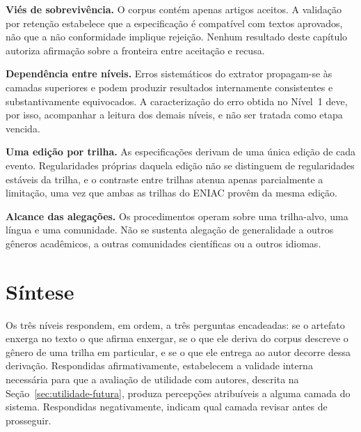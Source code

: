 \textbf{Viés de sobrevivência.} O corpus contém apenas artigos aceitos. A validação por retenção estabelece que a especificação é compatível com textos aprovados, não que a não conformidade implique rejeição. Nenhum resultado deste capítulo autoriza afirmação sobre a fronteira entre aceitação e recusa.

\textbf{Dependência entre níveis.} Erros sistemáticos do extrator propagam-se às camadas superiores e podem produzir resultados internamente consistentes e substantivamente equivocados. A caracterização do erro obtida no Nível~1 deve, por isso, acompanhar a leitura dos demais níveis, e não ser tratada como etapa vencida.

\textbf{Uma edição por trilha.} As especificações derivam de uma única edição de cada evento. Regularidades próprias daquela edição não se distinguem de regularidades estáveis da trilha, e o contraste entre trilhas atenua apenas parcialmente a limitação, uma vez que ambas as trilhas do ENIAC provêm da mesma edição.

\textbf{Alcance das alegações.} Os procedimentos operam sobre uma trilha-alvo, uma língua e uma comunidade. Não se sustenta alegação de generalidade a outros gêneros acadêmicos, a outras comunidades científicas ou a outros idiomas.


\section{Síntese}
\label{sec:sintese-avaliacao}

Os três níveis respondem, em ordem, a três perguntas encadeadas: se o artefato enxerga no texto o que afirma enxergar, se o que ele deriva do corpus descreve o gênero de uma trilha em particular, e se o que ele entrega ao autor decorre dessa derivação. Respondidas afirmativamente, estabelecem a validade interna necessária para que a avaliação de utilidade com autores, descrita na Seção~\ref{sec:utilidade-futura}, produza percepções atribuíveis a alguma camada do sistema. Respondidas negativamente, indicam qual camada revisar antes de prosseguir.